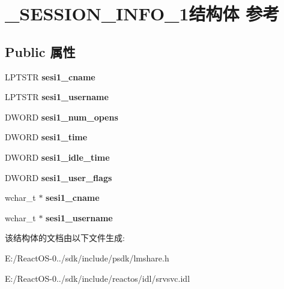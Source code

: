\hypertarget{struct___s_e_s_s_i_o_n___i_n_f_o__1}{}\section{\+\_\+\+S\+E\+S\+S\+I\+O\+N\+\_\+\+I\+N\+F\+O\+\_\+1结构体 参考}
\label{struct___s_e_s_s_i_o_n___i_n_f_o__1}
\subsection*{Public 属性}
\begin{DoxyCompactItemize}
\item 
\mbox{\label{struct___s_e_s_s_i_o_n___i_n_f_o__1_a8658a88fa260819a374ac75bb0abadf2}} 
L\+P\+T\+S\+TR {\bfseries sesi1\+\_\+cname}
\item 
\mbox{\label{struct___s_e_s_s_i_o_n___i_n_f_o__1_a2b9c1d6a71b182d8c91c2f9638e35cff}} 
L\+P\+T\+S\+TR {\bfseries sesi1\+\_\+username}
\item 
\mbox{\label{struct___s_e_s_s_i_o_n___i_n_f_o__1_ae1c1f3de712d9c809276ced2ab4e3548}} 
D\+W\+O\+RD {\bfseries sesi1\+\_\+num\+\_\+opens}
\item 
\mbox{\label{struct___s_e_s_s_i_o_n___i_n_f_o__1_a7ac70110d816e79d17ab4b9e1184802d}} 
D\+W\+O\+RD {\bfseries sesi1\+\_\+time}
\item 
\mbox{\label{struct___s_e_s_s_i_o_n___i_n_f_o__1_ad1fb32c30a32a348a618b9a9c3d50458}} 
D\+W\+O\+RD {\bfseries sesi1\+\_\+idle\+\_\+time}
\item 
\mbox{\label{struct___s_e_s_s_i_o_n___i_n_f_o__1_a5d49c57eb49f6fd9a2865a41444f0375}} 
D\+W\+O\+RD {\bfseries sesi1\+\_\+user\+\_\+flags}
\item 
\mbox{\label{struct___s_e_s_s_i_o_n___i_n_f_o__1_ad02787f01d1a832f6be9c0e403111673}} 
wchar\+\_\+t $\ast$ {\bfseries sesi1\+\_\+cname}
\item 
\mbox{\label{struct___s_e_s_s_i_o_n___i_n_f_o__1_a042bcc5d85fdd96a396fdc93b3c72832}} 
wchar\+\_\+t $\ast$ {\bfseries sesi1\+\_\+username}
\end{DoxyCompactItemize}


该结构体的文档由以下文件生成\+:\begin{DoxyCompactItemize}
\item 
E\+:/\+React\+O\+S-\/0../sdk/include/psdk/lmshare.\+h\item 
E\+:/\+React\+O\+S-\/0../sdk/include/reactos/idl/srvsvc.\+idl\end{DoxyCompactItemize}
